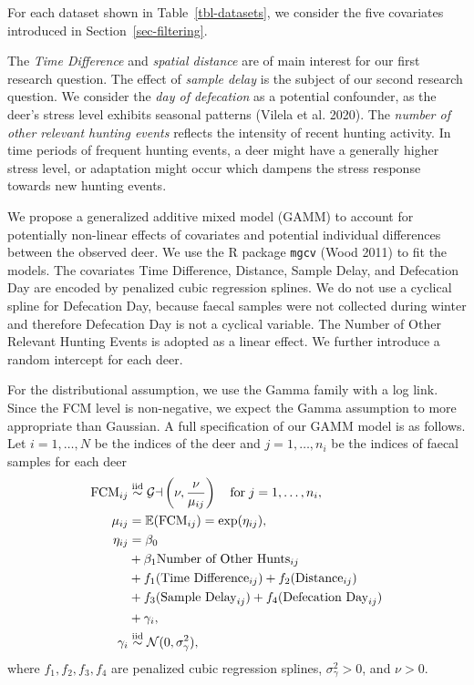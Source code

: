 \documentclass[
  letterpaper,
  DIV=11,
  numbers=noendperiod,
  twocolumn,
  open=any]{scrreprt}
\begin{document}
For each dataset shown in Table~\ref{tbl-datasets}, we consider the five
covariates introduced in Section~\ref{sec-filtering}.

The \emph{Time Difference} and \emph{spatial distance} are of main
interest for our first research question. The effect of \emph{sample
delay} is the subject of our second research question. We consider the
\emph{day of defecation} as a potential confounder, as the deer's stress
level exhibits seasonal patterns (Vilela et al. 2020). The \emph{number
of other relevant hunting events} reflects the intensity of recent
hunting activity. In time periods of frequent hunting events, a deer
might have a generally higher stress level, or adaptation might occur
which dampens the stress response towards new hunting events.

We propose a generalized additive mixed model (GAMM) to account for
potentially non-linear effects of covariates and potential individual
differences between the observed deer. We use the R package
\texttt{mgcv} (Wood 2011) to fit the models. The covariates Time
Difference, Distance, Sample Delay, and Defecation Day are encoded by
penalized cubic regression splines. We do not use a cyclical spline for
Defecation Day, because faecal samples were not collected during winter
and therefore Defecation Day is not a cyclical variable. The Number of
Other Relevant Hunting Events is adopted as a linear effect. We further
introduce a random intercept for each deer.

For the distributional assumption, we use the Gamma family with a log
link. Since the FCM level is non-negative, we expect the Gamma
assumption to more appropriate than Gaussian. A full specification of
our GAMM model is as follows. Let \(i = 1,\dots,N\) be the indices of
the deer and \(j = 1,\dots,n_i\) be the indices of faecal samples for
each deer \begin{align*}
  \textup{FCM}_{ij} &\overset{\mathrm{iid}}{\sim} \mathcal{Ga}\left( \nu, \frac{\nu}{\mu_{ij}} \right) \quad\text{for}\; j = 1,\dots,n_i, \\
  \mu_{ij} &= \mathbb{E}(\textup{FCM}_{ij}) = \exp(\eta_{ij}), \\
  \eta_{ij} &= \beta_0 \\
  &+ \beta_1 \textup{Number of Other Hunts}_{ij} \\
  &+ f_1(\textup{Time Difference}_{ij}) + f_2(\textup{Distance}_{ij}) \\
  &+ f_3(\textup{Sample Delay}_{ij}) + f_4(\textup{Defecation Day}_{ij}) \\
  &+ \gamma_{i}, \\
  \gamma_i &\overset{\mathrm{iid}}{\sim} \mathcal{N}(0, \sigma_\gamma^2),
\end{align*} where \(f_1, f_2, f_3, f_4\) are penalized cubic regression
splines, \(\sigma_\gamma^2 > 0\), and \(\nu > 0\).
\end{document}

